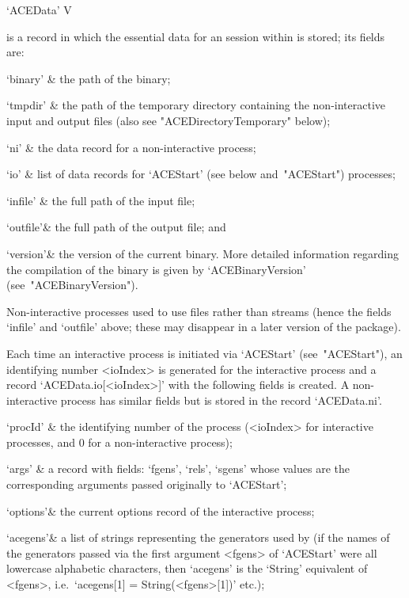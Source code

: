 
\>`ACEData' V

is a {\GAP} record in which the essential data for an  {\ACE}  session
within {\GAP} is stored; its fields are:

\beginitems

\quad`binary' & the path of the {\ACE} binary;

\quad`tmpdir' & the path of the  temporary  directory  containing  the
non-interactive   {\ACE}   input   and   output   files   (also    see
"ACEDirectoryTemporary" below);

\quad`ni'     & the data record for a non-interactive {\ACE} process;

\quad`io'     & list  of  data  records  for  `ACEStart'   (see  below 
and~"ACEStart") processes;

\quad`infile' & the full path of the {\ACE} input file;

\quad`outfile'& the full path of the {\ACE} output file; and

\quad`version'& the  version  of  the  current  {\ACE}  binary.   More
detailed information regarding the compilation of the binary is  given
by `ACEBinaryVersion' (see~"ACEBinaryVersion").

\enditems

Non-interactive processes used to use files rather than streams (hence
the fields `infile' and `outfile' above;  these  may  disappear  in  a
later version of the {\ACE} package).

Each time an interactive {\ACE} process is  initiated  via  `ACEStart'
(see~"ACEStart"), an identifying number <ioIndex> is generated for the
interactive process and  a  record  `ACEData.io[<ioIndex>]'  with  the
following fields is created. A  non-interactive  process  has  similar
fields but is stored in the record `ACEData.ni'.

\beginitems

\quad`procId' & the identifying number of the process  (<ioIndex>  for
interactive processes, and 0 for a non-interactive process);

\quad`args'   & a record with fields: `fgens', `rels',  `sgens'  whose
values  are  the  corresponding   arguments   passed   originally   to
`ACEStart';

\quad`options'& the current options record of the interactive process;

\quad`acegens'& a list of strings representing the generators used  by
{\ACE} (if the names of the generators passed via the  first  argument
<fgens> of `ACEStart' were all lowercase alphabetic  characters,  then
`acegens' is the `String' equivalent of <fgens>,  i.e.~`acegens[1]   =
String(<fgens>[1])' etc.);

